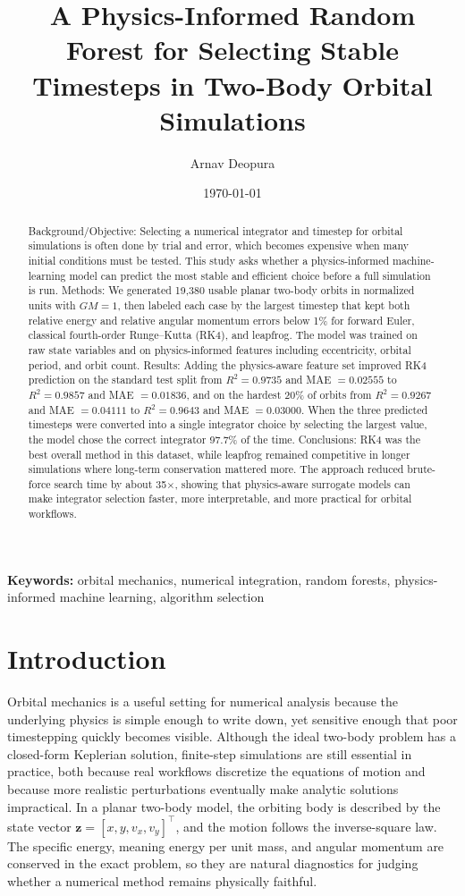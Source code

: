 \documentclass[12pt]{article}
\title{A Physics-Informed Random Forest for Selecting Stable Timesteps in Two-Body Orbital Simulations}
\author{Arnav Deopura}
\affil{Green Hope High School, Cary, North Carolina, 27519}
\date{\today}
\begin{document}
\maketitle

\begin{abstract}
Background/Objective: Selecting a numerical integrator and timestep for orbital simulations is often done by trial and error, which becomes expensive when many initial conditions must be tested. This study asks whether a physics-informed machine-learning model can predict the most stable and efficient choice before a full simulation is run. Methods: We generated 19,380 usable planar two-body orbits in normalized units with $GM=1$, then labeled each case by the largest timestep that kept both relative energy and relative angular momentum errors below 1\% for forward Euler, classical fourth-order Runge--Kutta (RK4), and leapfrog. The model was trained on raw state variables and on physics-informed features including eccentricity, orbital period, and orbit count. Results: Adding the physics-aware feature set improved RK4 prediction on the standard test split from $R^2 = 0.9735$ and MAE $= 0.02555$ to $R^2 = 0.9857$ and MAE $= 0.01836$, and on the hardest 20\% of orbits from $R^2 = 0.9267$ and MAE $= 0.04111$ to $R^2 = 0.9643$ and MAE $= 0.03000$. When the three predicted timesteps were converted into a single integrator choice by selecting the largest value, the model chose the correct integrator 97.7\% of the time. Conclusions: RK4 was the best overall method in this dataset, while leapfrog remained competitive in longer simulations where long-term conservation mattered more. The approach reduced brute-force search time by about 35$\times$, showing that physics-aware surrogate models can make integrator selection faster, more interpretable, and more practical for orbital workflows.
\end{abstract}

\noindent\textbf{Keywords:} orbital mechanics, numerical integration, random forests, physics-informed machine learning, algorithm selection

\section{Introduction}
Orbital mechanics is a useful setting for numerical analysis because the underlying physics is simple enough to write down, yet sensitive enough that poor timestepping quickly becomes visible. Although the ideal two-body problem has a closed-form Keplerian solution, finite-step simulations are still essential in practice, both because real workflows discretize the equations of motion and because more realistic perturbations eventually make analytic solutions impractical\supercite{curtis2020,bate1971,battin1999,vallado2022,roy2005}. In a planar two-body model, the orbiting body is described by the state vector $\mathbf{z} = [x, y, v_x, v_y]^\top$, and the motion follows the inverse-square law. The specific energy, meaning energy per unit mass, and angular momentum are conserved in the exact problem, so they are natural diagnostics for judging whether a numerical method remains physically faithful.
\end{document}
